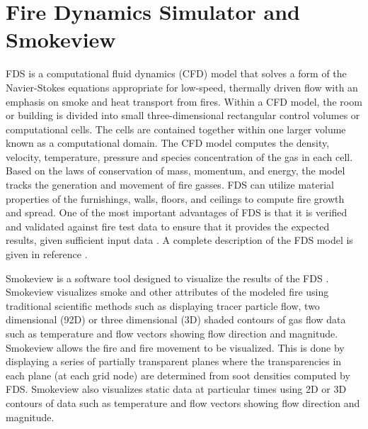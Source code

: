 \documentclass[11pt,oneside]{book}
\begin{document}
\chapter{Fire Dynamics Simulator and Smokeview}
FDS is a computational fluid dynamics (CFD) model that solves a form of the Navier-Stokes equations appropriate for low-speed, thermally driven flow with an emphasis on smoke and heat transport from fires.  Within a CFD model, the room or building is divided into small three-dimensional rectangular control volumes or computational cells.  The cells are contained together within one larger volume known as a computational domain.  The CFD model computes the density, velocity, temperature, pressure and species concentration of the gas in each cell.  Based on the laws of conservation of mass, momentum,  and energy, the model tracks the generation and movement of fire gasses.  FDS can utilize material properties of the furnishings, walls, floors, and ceilings to compute fire growth and spread.  One of the most important advantages of FDS is that it is verified and validated against fire test data to ensure that it provides the expected results, given sufficient input data \cite{FDS_Verification_Guide,FDS_Validation_Guide}.  A complete description of the FDS model is given in reference \cite{FDS_Tech_Guide}.

Smokeview is a software tool designed to visualize the results of the FDS \cite{Smokeview_Users_Guide}.  Smokeview visualizes smoke and other attributes of the modeled fire using traditional scientific methods such as displaying tracer particle flow, two dimensional (92D) or three dimensional (3D) shaded contours of gas flow data such as temperature and flow vectors showing flow direction and magnitude.  Smokeview allows the fire and fire movement to be visualized.  This is done by displaying a series of partially transparent planes where the transparencies in each plane (at each grid node) are determined from soot densities computed by FDS.  Smokeview also visualizes static data at particular times using 2D or 3D contours of data such as temperature and flow vectors showing flow direction and magnitude.
\end{document}
